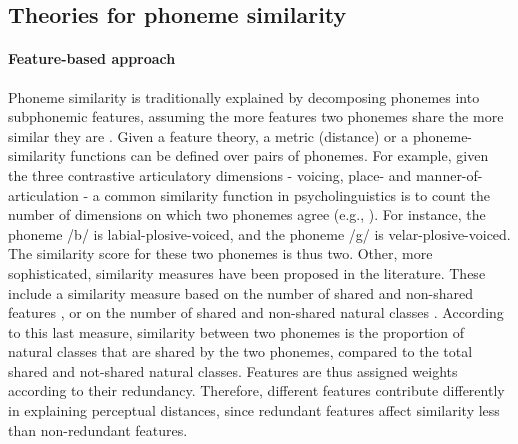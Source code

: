 \subsection{Theories for phoneme similarity}
\paragraph{Feature-based approach}
Phoneme similarity is traditionally explained by decomposing phonemes into subphonemic features, assuming the more features two phonemes share the more similar they are \citep{Tversky1977, Shepard1987, Cohen2009, Cohen2010}. Given a feature theory, a metric (distance) or a phoneme-similarity functions can be defined over pairs of phonemes. For example, given the three contrastive articulatory dimensions - voicing, place- and manner-of-articulation - a common similarity function in psycholinguistics is to count the number of dimensions on which two phonemes agree (e.g., \citealp{mcmillan2010cascading, Bailey2005, mousikou2015masked}). For instance, the phoneme /b/ is labial-plosive-voiced, and the phoneme /g/ is velar-plosive-voiced. The similarity score for these two phonemes is thus two. Other, more sophisticated, similarity measures have been proposed in the literature. These include a similarity measure based on the number of shared and non-shared features \citep{Pierrehumbert1993}, or on the number of shared and non-shared natural classes \citep{Frisch1997}. According to this last measure, similarity between two phonemes is the proportion of natural classes that are shared by the two phonemes, compared to the total shared and not-shared natural classes. Features are thus assigned weights according to their redundancy. Therefore, different features contribute differently in explaining perceptual distances, since redundant features affect similarity less than non-redundant features.

